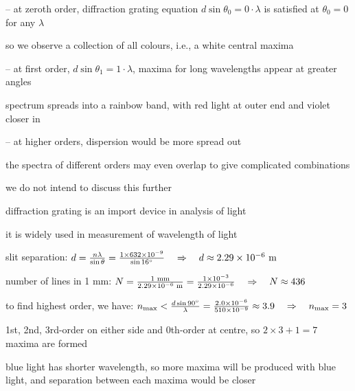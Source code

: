 \newpage

\begin{compactitem}
	\item[--] at zeroth order, diffraction grating equation $d\sin\theta_0 = 0\cdot\lambda$ is satisfied at $\theta_0 = 0$ for any $\lambda$
	
	so we observe a collection of all colours, i.e., a white central maxima
	
	\item[--] at first order, $d\sin\theta_1 = 1\cdot\lambda$, maxima for long wavelengths appear at greater angles
	
	spectrum spreads into a rainbow band, with red light at outer end and violet closer in
	
	\item[--] at higher orders, dispersion would be more spread out 
	
	the spectra of different orders may even overlap to give complicated combinations
	
	we do not intend to discuss this further
\end{compactitem}

\cmt diffraction grating is an import device in analysis of light

it is widely used in measurement of wavelength of light


\begin{soln} slit separation: $d = \frac{n\lambda}{\sin\theta} = \frac{1\times632\times10^{-9}}{\sin 16^\circ} \quad \Rightarrow \quad d \approx 2.29 \times 10^{-6} \text{ m}$

number of lines in 1 mm: $N = \frac{1 \text{ mm}}{2.29 \times 10^{-6} \text{ m}} = \frac{1 \times 10^{-3}}{2.29 \times 10^{-6}} \quad \Rightarrow \quad N \approx 436$ \end{soln}


\begin{soln} to find highest order, we have: $n_{\text{max}} < \frac{d\sin 90^\circ}{\lambda} = \frac{2.0\times10^{-6}}{510\times10^{-9}} \approx 3.9 \quad \Rightarrow \quad n_{\text{max}} = 3$

1st, 2nd, 3rd-order on either side and 0th-order at centre, so $ 2\times 3 + 1 = 7$ maxima are formed

blue light has shorter wavelength, so more maxima will be produced with blue light, and separation between each maxima would be closer \end{soln}

